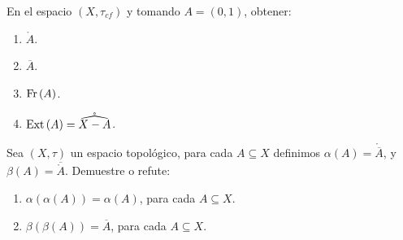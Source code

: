 \documentclass[12pt]{report}
\theoremstyle{largebreak}
\newcommand{\Int}[1]{\ensuremath{\mathring{#1}}}
\newcommand{\Cls}[1]{\ensuremath{\overline{#1}}}
\newcommand{\Fr}[1]{\ensuremath{\textup{Fr}\left(#1\right)}}
\newcommand{\Ext}[1]{\ensuremath{\textup{Ext}\left(#1\right)}}
\begin{document}
    \begin{sol}
        
    \end{sol}

    \begin{excer}
        En el espacio $(X,\tau_{cf})$ y tomando $A=(0,1)$, obtener:
        \begin{enumerate}
            \item $\Int{A}$.
            \item $\Cls{A}$.
            \item $\Fr{A}$.
            \item $\Ext{A}=\Int{\widehat{X-A}}$.
        \end{enumerate}
    \end{excer}

    \begin{sol}
        
    \end{sol}

    \begin{excer}
        Sea $(X,\tau)$ un espacio topológico, para cada $A\subseteq X$ definimos $\alpha(A)=\Int{\Cls{A}}$, y $\beta(A)=\Cls{\Int{A}}$. Demuestre o refute:
        \begin{enumerate}
            \item $\alpha(\alpha(A))=\alpha(A)$, para cada $A\subseteq X$.
            \item $\beta(\beta(A))=\Cls{A}$, para cada $A\subseteq X$.
        \end{enumerate}
    \end{excer}
\end{document}
